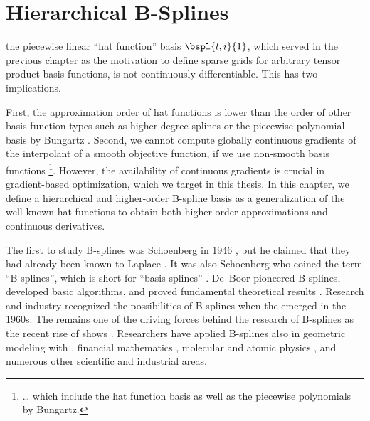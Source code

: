 
\chapter{Hierarchical B-Splines}
\label{chap:30BSplines}

the piecewise linear ``hat function'' basis $\bspl{l,i}{1}$,
which served in the previous chapter as the motivation
to define sparse grids for arbitrary tensor product basis functions,
is not continuously differentiable.
This has two implications.


First, the approximation order of hat functions
is lower than the order of other basis function types
such as higher-degree splines \cite{Sickel11Spline}
or the piecewise polynomial basis by Bungartz \cite{Bungartz98Finite}.
Second, we cannot compute globally continuous gradients of the
interpolant of a smooth objective function,
if we use non-smooth basis functions%
\footnote{%
  \dots{} which include the hat function basis as well as
  the piecewise polynomials by Bungartz.%
}.
However, the availability of continuous gradients is
crucial in gradient-based optimization,
which we target in this thesis.
In this chapter, we define a hierarchical and
higher-order B-spline basis
as a generalization of the well-known hat functions
to obtain both higher-order approximations
and continuous derivatives.

The first to study B-splines was Schoenberg in 1946
\cite{Schoenberg46Contributions},
but he claimed that they had already been known to Laplace
\cite{Boor76Splines}.
It was also Schoenberg who coined the term ``B-splines'',
which is short for ``basis splines'' \cite{Schoenberg67Spline}.
De~Boor pioneered B-splines, developed basic algorithms, and
proved fundamental theoretical results \cite{Boor72Calculating}.
Research and industry recognized the possibilities of B-splines when
the \fem emerged in the 1960s.
The \fem remains one of the driving forces behind the research of
B-splines \cite{Hoellig03Finite} as the recent rise of \iga shows
.
Researchers have applied B-splines also in
geometric modeling with \nurbs
{},
financial mathematics \cite{Pflueger10Spatially},
molecular and atomic physics
,
and numerous other scientific and industrial areas.

